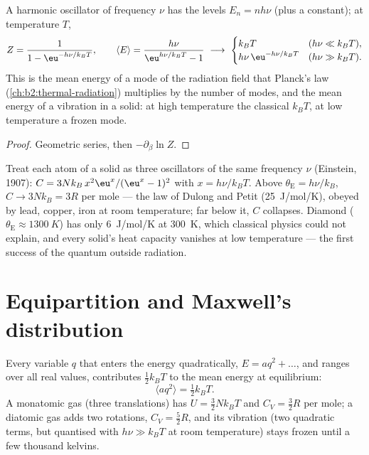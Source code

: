 \begin{proposition}\label{prop:b2:boltzmann-factor:oscillator}
A harmonic oscillator of frequency $\nu$ has the levels $E_n = nh\nu$ (plus
a constant); at temperature $T$,
\[
Z = \frac{1}{1 - \eu^{-h\nu/k_BT}}, \qquad
\langle E\rangle = \frac{h\nu}{\eu^{h\nu/k_BT} - 1}
\ \longrightarrow\
\begin{cases} k_BT & (h\nu \ll k_BT), \\ h\nu\,\eu^{-h\nu/k_BT} & (h\nu \gg k_BT). \end{cases}
\]
This is the mean energy of a mode of the radiation field that Planck's
law (\cref{ch:b2:thermal-radiation}) multiplies by the number of modes,
and the mean energy of a vibration in a solid: at high temperature the
classical $k_BT$, at low temperature a frozen mode.
\end{proposition}

\begin{proof}
Geometric series, then $-\partial_\beta\ln Z$.
\end{proof}

\begin{example}\label{ex:b2:boltzmann-factor:einstein}
Treat each atom of a solid as three oscillators of the same frequency
$\nu$ (Einstein, 1907): $C = 3Nk_B\,x^2\eu^x/(\eu^x - 1)^2$ with $x =
h\nu/k_BT$. Above $\theta_{\text{E}} = h\nu/k_B$, $C \to 3Nk_B = 3R$ per mole
--- the law of Dulong and Petit (\qty{25}{J/mol/K}), obeyed by lead,
copper, iron at room temperature; far below it, $C$ collapses. Diamond
($\theta_{\text{E}} \approx \qty{1300}{K}$) has only \qty{6}{J/mol/K} at
\qty{300}{K}, which classical physics could not explain, and every solid's
heat capacity vanishes at low temperature --- the first success of the
quantum outside radiation.
\end{example}

\section{Equipartition and Maxwell's distribution}

\begin{theorem}\label{thm:b2:boltzmann-factor:equipartition}
Every variable $q$ that enters the energy quadratically, $E = aq^2 +
\dots$, and ranges over all real values, contributes $\tfrac12k_BT$ to
the mean energy at equilibrium:
\[
\langle aq^2\rangle = \tfrac12k_BT .
\]
A monatomic gas (three translations) has $U = \tfrac32Nk_BT$ and $C_V =
\tfrac32R$ per mole; a diatomic gas adds two rotations, $C_V = \tfrac52R$,
and its vibration (two quadratic terms, but quantised with $h\nu \gg
k_BT$ at room temperature) stays frozen until a few thousand kelvins.
\end{theorem}


